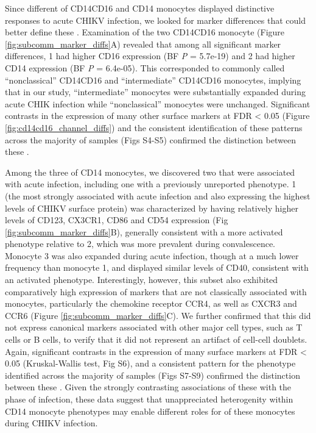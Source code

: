 Since different \subcommunities{} of CD14\sups{+}\allowbreak CD16\sups{+} and CD14\sups{+} monocytes displayed distinctive responses to acute CHIKV infection, we looked for marker differences that could better define these \subcommunities{}. Examination of the two CD14\sups{+}\allowbreak CD16\sups{+} monocyte \subcommunities{} (Figure \ref{fig:subcomm_marker_diffs}A) revealed that among all significant marker differences, \subcommunity{} 1 had higher CD16 expression (BF \emph{P} = 5.7e-19) and \subcommunity{} 2 had higher CD14 expression (BF \emph{P} = 6.4e-05). This corresponded to \subcommunities{} commonly called “nonclassical” CD14\sups{+}\allowbreak CD16\sups{++} and “intermediate” CD14\sups{++}\allowbreak CD16\sups{+} monocytes,\autocite{Wong2011,Ziegler-Heitbrock2010} implying that in our study, “intermediate” monocytes were substantially expanded during acute CHIK infection while “nonclassical” monocytes were unchanged. Significant contrasts in the expression of many other surface markers at FDR < 0.05 (Figure \ref{fig:cd14cd16_channel_diffs}) and the consistent identification of these patterns across the majority of samples (Figs S4-S5) confirmed the distinction between these \subcommunities{}.

Among the three \subcommunities{} of CD14\sups{+} monocytes, we discovered two that were associated with acute infection, including one with a previously unreported phenotype. \subcommunity{} 1 (the \subcommunity{} most strongly associated with acute infection and also expressing the highest levels of CHIKV surface protein) was characterized by having relatively higher levels of CD123, CX3CR1, CD86 and CD54 expression (Fig \ref{fig:subcomm_marker_diffs}B), generally consistent with a more activated phenotype relative to \subcommunity{} 2, which was more prevalent during convalescence. Monocyte \subcommunity{} 3 was also expanded during acute infection, though at a much lower frequency than monocyte \subcommunity{} 1, and displayed similar levels of CD40, consistent with an activated phenotype. Interestingly, however, this subset also exhibited comparatively high expression of markers that are not classically associated with monocytes, particularly the chemokine receptor CCR4, as well as CXCR3 and CCR6 (Figure \ref{fig:subcomm_marker_diffs}C). We further confirmed that this \subcommunity{} did not express canonical markers associated with other major cell types, such as T cells or B cells, to verify that it did not represent an artifact of cell-cell doublets. Again, significant contrasts in the expression of many surface markers at FDR < 0.05 (Kruskal-Wallis test, Fig S6), and a consistent pattern for the phenotype identified across the majority of samples (Figs S7-S9) confirmed the distinction between these \subcommunities{}. Given the strongly contrasting associations of these \subcommunities{} with the phase of infection, these data suggest that unappreciated heterogenity within CD14\sups{+} monocyte phenotypes may enable different roles for \subcommunities{} of these monocytes during CHIKV infection.  

